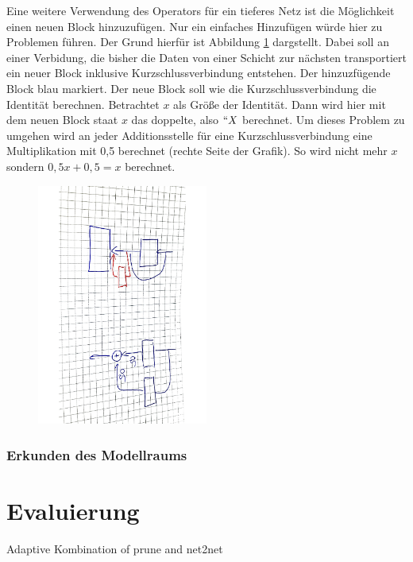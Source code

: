 Eine weitere Verwendung des Operators für ein tieferes Netz ist die Möglichkeit einen neuen Block hinzuzufügen. Nur ein einfaches Hinzufügen würde hier zu Problemen führen. Der Grund hierfür ist Abbildung \ref{abb:deeper} dargstellt. Dabei soll an einer Verbidung, die bisher die Daten von einer Schicht zur nächsten transportiert ein neuer Block inklusive Kurzschlussverbindung entstehen. Der hinzuzfügende Block blau  markiert. Der neue Block soll wie die Kurzschlussverbindung die Identität berechnen. Betrachtet $x$ als Größe der Identität. Dann wird hier mit dem neuen Block staat $x$ das doppelte, also $``X$ berechnet. Um dieses Problem zu umgehen wird an jeder Additionsstelle für eine Kurzschlussverbindung eine Multiplikation mit 0,5 berechnet (rechte Seite der Grafik). So wird nicht mehr $x$ sondern $0,5x +0,5=x$ berechnet.  


\begin{figure}[h]
 \centering
 \includegraphics[width=0.5\textwidth, angle=90]{KapitelPartB/Images/deeper.pdf}
 \label{abb:deeper}
\end{figure}




\subsection{Erkunden des Modellraums}



\chapter{Evaluierung }\label{sec:ptpnet2net}
Adaptive Kombination of prune and net2net

